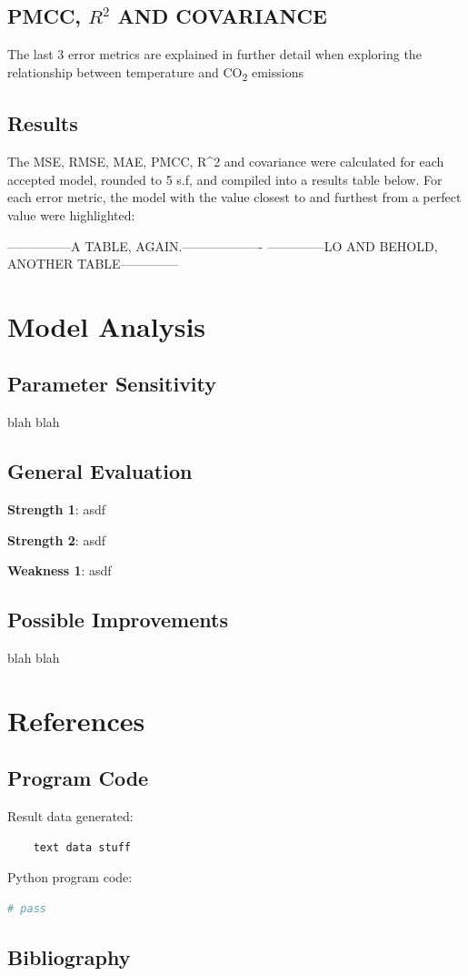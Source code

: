 \documentclass{mcmthesis}
\begin{document}
    \subsection{PMCC, ${R^2}$ AND COVARIANCE}
    The last 3 error metrics are explained in further detail when exploring the relationship between temperature and CO\textsubscript{2} emissions

    \subsection{Results}
    The MSE, RMSE, MAE, PMCC, R^2 and covariance were calculated for each accepted model, rounded to 5 s.f, and compiled into a results table below. For each error metric, the model with the value closest to and furthest from a perfect value were highlighted:

    ---------------A TABLE, AGAIN.-------------------
    --------------LO AND BEHOLD, ANOTHER TABLE--------------



    \section{Model Analysis}

    \subsection{Parameter Sensitivity}
    blah blah

    \subsection{General Evaluation}

    \noindent\textbf{Strength 1}: asdf

    \noindent\textbf{Strength 2}: asdf

    \noindent\textbf{Weakness 1}: asdf

    \subsection{Possible Improvements}
    blah blah


    \newpage


    \section{References}

    \subsection{Program Code}
    \noindent Result data generated:
    \begin{verbatim}
    text data stuff

    \end{verbatim}

    \noindent Python program code:
    \begin{lstlisting}[language=Python]
        # pass

    \end{lstlisting}

    \subsection{Bibliography}
\end{document}
